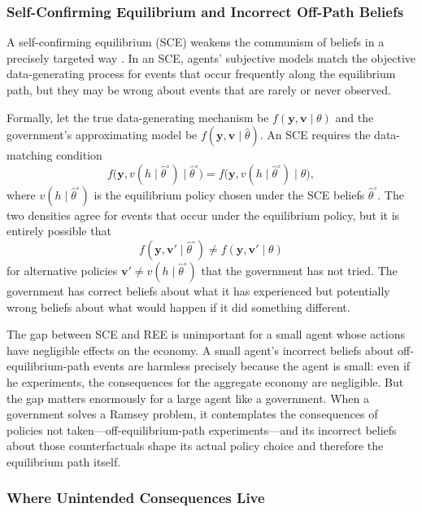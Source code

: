 \documentclass[12pt]{article}
\begin{document}
\subsubsection{Self-Confirming Equilibrium and Incorrect Off-Path Beliefs}

A self-confirming equilibrium (SCE) weakens the communism of beliefs in a precisely targeted way \cite{Sargent2008}. In an SCE, agents' subjective models match the objective data-generating process for events that occur frequently along the equilibrium path, but they may be wrong about events that are rarely or never observed.

Formally, let the true data-generating mechanism be $f(\mathbf{y}, \mathbf{v} \mid \theta)$ and the government's approximating model be $f(\mathbf{y}, \mathbf{v} \mid \hat{\theta})$. An SCE requires the data-matching condition
\[
f\bigl(\mathbf{y}, v(h \mid \hat{\theta}^{\circ}) \mid \hat{\theta}^{\circ}\bigr) = f\bigl(\mathbf{y}, v(h \mid \hat{\theta}^{\circ}) \mid \theta\bigr),
\]
where $v(h \mid \hat{\theta}^{\circ})$ is the equilibrium policy chosen under the SCE beliefs $\hat{\theta}^{\circ}$. The two densities agree for events that occur under the equilibrium policy, but it is entirely possible that
\[
f(\mathbf{y}, \mathbf{v}' \mid \hat{\theta}^{\circ}) \neq f(\mathbf{y}, \mathbf{v}' \mid \theta)
\]
for alternative policies $\mathbf{v}' \neq v(h \mid \hat{\theta}^{\circ})$ that the government has not tried. The government has correct beliefs about what it has experienced but potentially wrong beliefs about what would happen if it did something different.

The gap between SCE and REE is unimportant for a small agent whose actions have negligible effects on the economy. A small agent's incorrect beliefs about off-equilibrium-path events are harmless precisely because the agent is small: even if he experiments, the consequences for the aggregate economy are negligible. But the gap matters enormously for a large agent like a government. When a government solves a Ramsey problem, it contemplates the consequences of policies not taken---off-equilibrium-path experiments---and its incorrect beliefs about those counterfactuals shape its actual policy choice and therefore the equilibrium path itself.

\subsubsection{Where Unintended Consequences Live}
\end{document}
